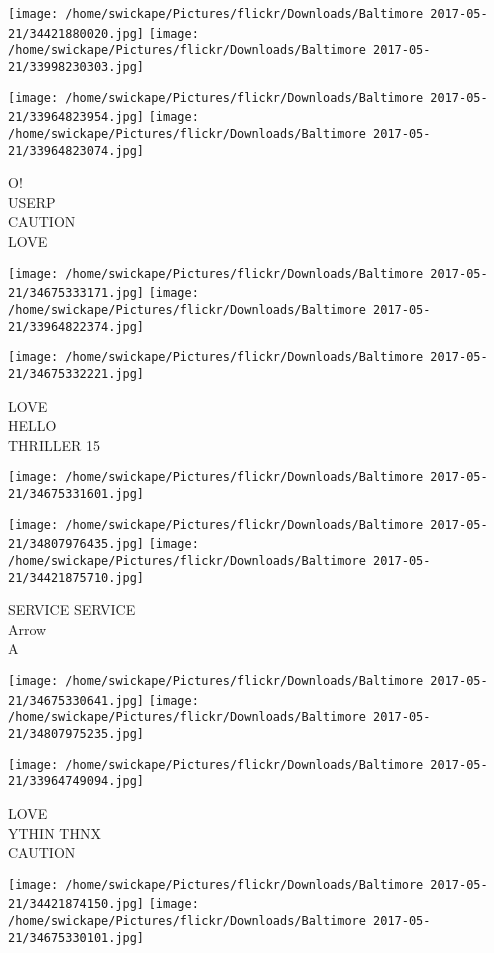 \documentclass[10pt,letterpaper]{article}
\begin{document}
\texttt{[image: /home/swickape/Pictures/flickr/Downloads/Baltimore 2017-05-21/34421880020.jpg]}
\texttt{[image: /home/swickape/Pictures/flickr/Downloads/Baltimore 2017-05-21/33998230303.jpg]}

\texttt{[image: /home/swickape/Pictures/flickr/Downloads/Baltimore 2017-05-21/33964823954.jpg]}
\texttt{[image: /home/swickape/Pictures/flickr/Downloads/Baltimore 2017-05-21/33964823074.jpg]}

O!\\
USERP\\
CAUTION\\
LOVE
\pagebreak

\texttt{[image: /home/swickape/Pictures/flickr/Downloads/Baltimore 2017-05-21/34675333171.jpg]}
\texttt{[image: /home/swickape/Pictures/flickr/Downloads/Baltimore 2017-05-21/33964822374.jpg]}

\texttt{[image: /home/swickape/Pictures/flickr/Downloads/Baltimore 2017-05-21/34675332221.jpg]}

LOVE\\
HELLO\\
THRILLER 15
\pagebreak

\texttt{[image: /home/swickape/Pictures/flickr/Downloads/Baltimore 2017-05-21/34675331601.jpg]}

\vspace{0.25in}
\texttt{[image: /home/swickape/Pictures/flickr/Downloads/Baltimore 2017-05-21/34807976435.jpg]}
\texttt{[image: /home/swickape/Pictures/flickr/Downloads/Baltimore 2017-05-21/34421875710.jpg]}

SERVICE SERVICE\\
Arrow\\
A
\pagebreak

\texttt{[image: /home/swickape/Pictures/flickr/Downloads/Baltimore 2017-05-21/34675330641.jpg]}
\texttt{[image: /home/swickape/Pictures/flickr/Downloads/Baltimore 2017-05-21/34807975235.jpg]}

\vspace{0.25in}
\texttt{[image: /home/swickape/Pictures/flickr/Downloads/Baltimore 2017-05-21/33964749094.jpg]}

LOVE\\
YTHIN THNX\\
CAUTION
\pagebreak

\texttt{[image: /home/swickape/Pictures/flickr/Downloads/Baltimore 2017-05-21/34421874150.jpg]}
\texttt{[image: /home/swickape/Pictures/flickr/Downloads/Baltimore 2017-05-21/34675330101.jpg]}
\end{document}
